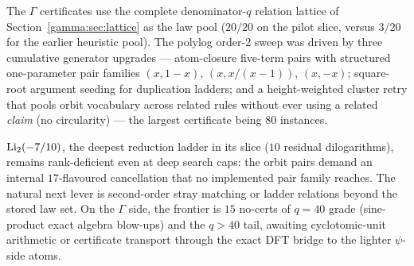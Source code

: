 The $\Gamma$ certificates use the complete denominator-$q$ relation lattice of
Section~\ref{gamma:sec:lattice} as the law pool ($20/20$ on the pilot slice, versus $3/20$ for
the earlier heuristic pool). The polylog order-2 sweep was driven by three cumulative
generator upgrades --- atom-closure five-term pairs with structured one-parameter pair
families $(x,1-x)$, $(x,x/(x-1))$, $(x,-x)$; square-root argument seeding for
duplication ladders; and a height-weighted cluster retry that pools orbit vocabulary
across related rules without ever using a related \emph{claim} (no circularity) --- the
largest certificate being $80$ instances.

\begin{negative}\label{gamma:neg:holdout}
$\operatorname{Li}_2(-7/10)$, the deepest reduction ladder in its slice ($10$ residual dilogarithms),
remains rank-deficient even at deep search caps: the orbit pairs demand an internal
$17$-flavoured cancellation that no implemented pair family reaches. The natural next
lever is second-order stray matching or ladder relations beyond the stored law set.
On the $\Gamma$ side, the frontier is $15$ no-certs of $q=40$ grade (sine-product exact
algebra blow-ups) and the $q>40$ tail, awaiting cyclotomic-unit arithmetic or certificate
transport through the exact DFT bridge to the lighter $\psi$-side atoms.
\end{negative}
